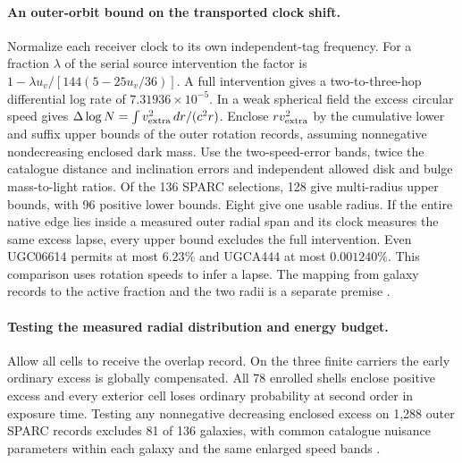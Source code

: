\documentclass[11pt]{article}
\begin{document}
\paragraph{An outer-orbit bound on the transported clock shift.}
Normalize each receiver clock to its own independent-tag frequency.
For a fraction $\lambda$ of the serial source intervention the factor is
$1-\lambda u_v/[144(5-25u_v/36)]$. A full intervention gives a
two-to-three-hop differential log rate of $7.31936\times10^{-5}$.
In a weak spherical field the excess circular speed gives
$\Delta\log N=\int v_{\rm extra}^2\,dr/(c^2r)$. Enclose $rv_{\rm extra}^2$
by the cumulative lower and suffix upper bounds of the outer rotation
records, assuming nonnegative nondecreasing enclosed dark mass.
Use the two-speed-error bands, twice the catalogue distance and inclination
errors and independent allowed disk and bulge mass-to-light ratios.
Of the 136 SPARC selections, 128 give multi-radius upper bounds, with
96 positive lower bounds. Eight give one usable radius.
If the entire native edge lies inside a measured outer radial span and
its clock measures the same excess lapse, every upper bound excludes
the full intervention. Even UGC06614 permits at most $6.23\%$ and
UGCA444 at most $0.001240\%$. This comparison uses rotation speeds to
infer a lapse. The mapping from galaxy records to the active fraction
and the two radii is a separate premise \cite{sparc2016}.

\paragraph{Testing the measured radial distribution and energy budget.}
Allow all cells to receive the overlap record. On the three finite
carriers the early ordinary excess is globally compensated. All 78
enrolled shells enclose positive excess and every exterior cell loses
ordinary probability at second order in exposure time. Testing any
nonnegative decreasing enclosed excess on 1,288 outer SPARC records
excludes 81 of 136 galaxies, with common catalogue nuisance parameters
within each galaxy and the same enlarged speed bands \cite{sparc2016}.
\end{document}

